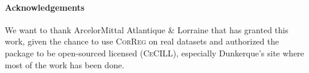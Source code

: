 \documentclass[11pt,a4paper]{article}
\begin{document}
\paragraph{Acknowledgements}
We want to thank ArcelorMittal Atlantique \& Lorraine that has granted this work, given the chance to use \textsc{CorReg} on real datasets and authorized the package to be open-sourced licensed (\textsc{CeCILL}), especially Dunkerque's site where most of the work has been done.
{}

%	
%	
%
\end{document}
